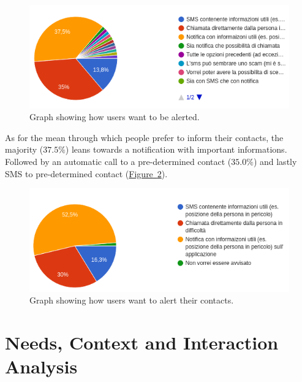 \documentclass[12pt]{article}
\begin{document}
\begin{figure}[ht]
    \centering
    \includegraphics[width=.7\textwidth]{Images/alert_me.png}
    \caption{Graph showing how users want to be alerted.}
    \label{fig:alert_me}
\end{figure}

As for the mean through which people prefer to inform their contacts,
the majority ($37.5\%$) leans towards a notification with important informations.
Followed by an automatic call to a pre-determined contact ($35.0\%$) and lastly SMS 
to pre-determined contact (\hyperref[fig:alert_others]{Figure~\ref*{fig:alert_others}}).

\begin{figure}[ht]
    \centering
    \includegraphics[width=.7\textwidth]{Images/alert_others.png}
    \caption{Graph showing how users want to alert their contacts.}
    \label{fig:alert_others}
\end{figure}

\section{Needs, Context and Interaction Analysis}
\end{document}
